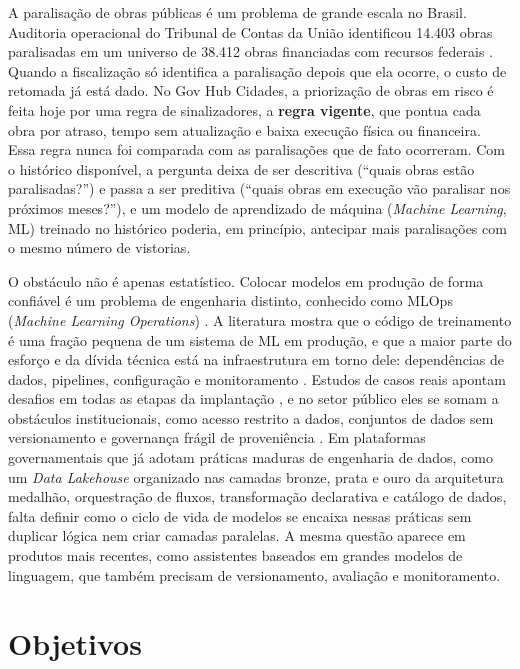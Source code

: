 A paralisação de obras públicas é um problema de grande escala no Brasil. Auditoria operacional do Tribunal de Contas da União identificou 14.403 obras paralisadas em um universo de 38.412 obras financiadas com recursos federais \cite{tcu2019}. Quando a fiscalização só identifica a paralisação depois que ela ocorre, o custo de retomada já está dado. No Gov Hub Cidades, a priorização de obras em risco é feita hoje por uma regra de sinalizadores, a \textbf{regra vigente}, que pontua cada obra por atraso, tempo sem atualização e baixa execução física ou financeira. Essa regra nunca foi comparada com as paralisações que de fato ocorreram. Com o histórico disponível, a pergunta deixa de ser descritiva (``quais obras estão paralisadas?'') e passa a ser preditiva (``quais obras em execução vão paralisar nos próximos meses?''), e um modelo de aprendizado de máquina (\textit{Machine Learning}, ML) treinado no histórico poderia, em princípio, antecipar mais paralisações com o mesmo número de vistorias.

O obstáculo não é apenas estatístico. Colocar modelos em produção de forma confiável é um problema de engenharia distinto, conhecido como MLOps (\textit{Machine Learning Operations}) \cite{kreuzberger2023}. A literatura mostra que o código de treinamento é uma fração pequena de um sistema de ML em produção, e que a maior parte do esforço e da dívida técnica está na infraestrutura em torno dele: dependências de dados, pipelines, configuração e monitoramento \cite{sculley2015}. Estudos de casos reais apontam desafios em todas as etapas da implantação \cite{paleyes2022}, e no setor público eles se somam a obstáculos institucionais, como acesso restrito a dados, conjuntos de dados sem versionamento e governança frágil de proveniência \cite{ferreira2025}. Em plataformas governamentais que já adotam práticas maduras de engenharia de dados, como um \textit{Data Lakehouse} organizado nas camadas bronze, prata e ouro da arquitetura medalhão, orquestração de fluxos, transformação declarativa e catálogo de dados, falta definir como o ciclo de vida de modelos se encaixa nessas práticas sem duplicar lógica nem criar camadas paralelas. A mesma questão aparece em produtos mais recentes, como assistentes baseados em grandes modelos de linguagem, que também precisam de versionamento, avaliação e monitoramento.

\section{Objetivos}
\label{sec:objetivos}

